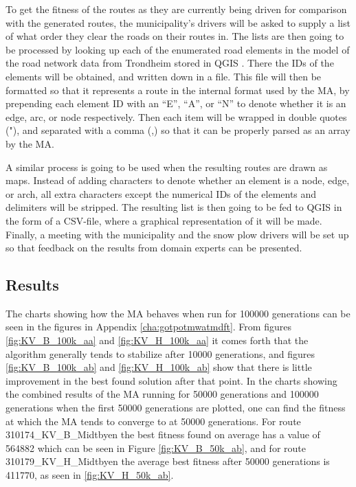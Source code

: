 To get the fitness of the routes as they are currently being driven for comparison with the generated routes, the municipality's drivers will be asked to supply a list of what order they clear the roads on their routes in. The lists are then going to be processed by looking up each of the enumerated road elements in the model of the road network data from Trondheim stored in QGIS \citep{QGISHomepage}. There the IDs of the elements will be obtained, and written down in a file. This file will then be formatted so that it represents a route in the internal format used by the MA, by prepending each element ID with an \enquote{E}, \enquote{A}, or \enquote{N} to denote whether it is an edge, arc, or node respectively. Then each item will be wrapped in double quotes ("), and separated with a comma (,) so that it can be properly parsed as an array by the MA.

A similar process is going to be used when the resulting routes are drawn as maps. Instead of adding characters to denote whether an element is a node, edge, or arch, all extra characters except the numerical IDs of the elements and delimiters will be stripped. The resulting list is then going to be fed to QGIS in the form of a CSV-file, where a graphical representation of it will be made. Finally, a meeting with the municipality and the snow plow drivers will be set up so that feedback on the results from domain experts can be presented.

\subsection{Results}

The charts showing how the MA behaves when run for 100000 generations can be seen in the figures in Appendix \ref{cha:gotpotmwatmdft}. From figures \ref{fig:KV_B_100k_aa} and \ref{fig:KV_H_100k_aa} it comes forth that the algorithm generally tends to stabilize after 10000 generations, and figures \ref{fig:KV_B_100k_ab} and \ref{fig:KV_H_100k_ab} show that there is little improvement in the best found solution after that point. In the charts showing the combined results of the MA running for 50000 generations and 100000 generations when the first 50000 generations are plotted, one can find the fitness at which the MA tends to converge to at 50000 generations. For route 310174\_KV\_B\_Midtbyen the best fitness found on average has a value of 564882 which can be seen in Figure \ref{fig:KV_B_50k_ab}, and for route 310179\_KV\_H\_Midtbyen the average best fitness after 50000 generations is 411770, as seen in \ref{fig:KV_H_50k_ab}.

